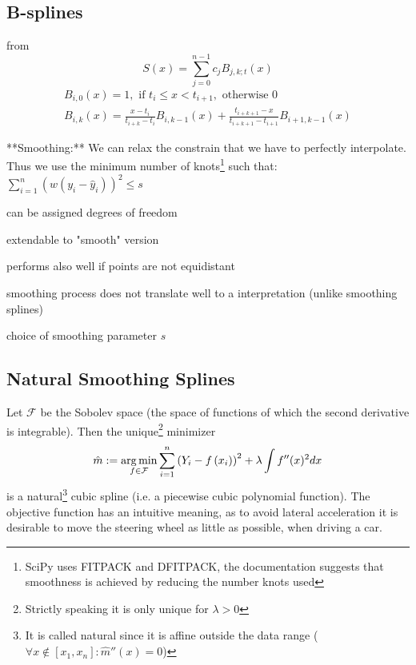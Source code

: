 \subsection{B-splines}
\label{sec:B}
from \cite{lycheSplineMethods2005}
$$
  S(x)=\sum_{j=0}^{n-1} c_{j} B_{j, k ; t}(x)
$$
$$
  \begin{array}{r}
    B_{i, 0}(x)=1, \text { if } t_{i} \leq x<t_{i+1}, \text { otherwise } 0 \\
    B_{i, k}(x)=\frac{x-t_{i}}{t_{i+k}-t_{i}} B_{i, k-1}(x)+\frac{t_{i+k+1}-x}{t_{i+k+1}-t_{i+1}} B_{i+1, k-1}(x)
  \end{array}
$$

**Smoothing:**
We can relax the constrain that we have to perfectly interpolate. Thus we use the minimum number of knots\footnote{SciPy uses FITPACK and DFITPACK, the documentation suggests that smoothness is achieved by reducing the number knots used} such that:
$\sum_{i=1}^n(w (y_i - \hat y_i))^2 \leq s$
\begin{my_pros_cons_table}{
    \item can be assigned degrees of freedom
    \item extendable to "smooth" version
    \item performs also well if points are not equidistant
  }{
    \item smoothing process does not translate well to a interpretation (unlike smoothing splines)
    \item choice of smoothing parameter $s$
  }
\end{my_pros_cons_table}


\subsection{Natural Smoothing Splines}
\label{sec:Natural}
Let $\mathcal F$ be the Sobolev space (the space of functions of which the second derivative is integrable). Then the unique\footnote{Strictly speaking it is only unique for $\lambda > 0$} minimizer
$$\hat m :=\operatorname*{arg\, min}_{f \in \mathcal F} \sum_{i=1}^{n}\left(Y_{i}-{f}\left(x_{i}\right)\right)^{2}+\lambda \int {f}^{\prime \prime}(x)^{2} d x$$
is a natural\footnote{It is called natural since it is affine outside the data range ($\forall x\notin [x_1, x_n]:\hat m''(x) = 0$)} cubic spline (i.e. a piecewise cubic polynomial function).
The objective function has an intuitive meaning, as to avoid lateral acceleration it is desirable to move the steering wheel as little as possible, when driving a car.



